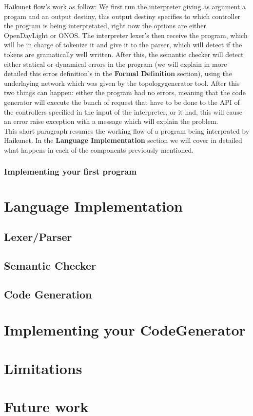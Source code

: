 Haikunet flow's work as follow: We first run the interpreter giving as argument a progam and an output destiny, this output destiny specifies to which controller the program is being interpretated, right now the options are either OpenDayLight or ONOS. The interpreter lexer's then receive the program, which will be in charge of tokenize it and give it to the parser, which will detect if the tokens are gramatically well written. After this, the semantic checker will detect either statical or dynamical errors in the program (we will explain in more detailed this erros definition's in the \textbf{Formal Definition} section), using the underlaying network which was given by the topologygenerator tool. After this two things can happen: either the program had no errors, meaning that the code generator will execute the bunch of request that have to be done to the API of the controllers specified in the input of the interpreter, or it had, this will cause an error raise exception with a message which will explain the problem. \\

This short paragraph resumes the working flow of a program being interprated by Haikunet. In the \textbf{Language Implementation} section we will cover in detailed what happens in each of the components previously mentioned.\\

\subsubsection{Implementing your first program}

\section{Language Implementation}

\subsection{Lexer/Parser}

\subsection{Semantic Checker}

\subsection{Code Generation}

\section{Implementing your CodeGenerator}

\section{Limitations}

\section{Future work}